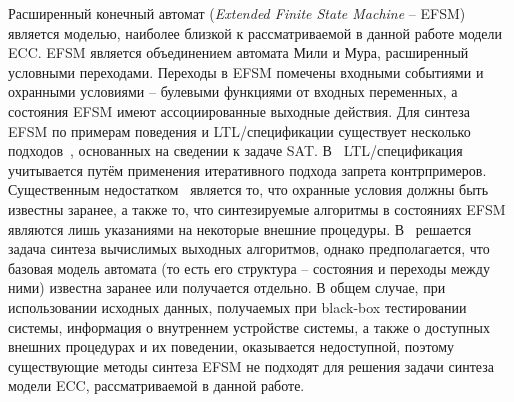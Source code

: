 Расширенный конечный автомат (\emph{Extended Finite State Machine} \--- EFSM) является моделью, наиболее близкой к рассматриваемой в данной работе модели ECC\@. EFSM является объединением автомата Мили и Мура, расширенный условными переходами. Переходы в EFSM помечены входными событиями и охранными условиями \--- булевыми функциями от входных переменных, а состояния EFSM имеют ассоциированные выходные действия.
Для синтеза EFSM по примерам поведения и LTL\-/спецификации существует несколько подходов~\cite{efsm-tools,walkinshaw}, основанных на сведении к задаче SAT. В~\cite{efsm-tools} LTL\-/спецификация учитывается путём применения итеративного подхода запрета контрпримеров.
Существенным недостатком~\cite{efsm-tools} является то, что охранные условия должны быть известны заранее, а также то, что синтезируемые алгоритмы в состояниях EFSM являются лишь указаниями на некоторые внешние процедуры.
В~\cite{walkinshaw} решается задача синтеза вычислимых выходных алгоритмов, однако предполагается, что базовая модель автомата (то есть его структура \--- состояния и переходы между ними) известна заранее или получается отдельно.
В общем случае, при использовании исходных данных, получаемых при black-box тестировании системы, информация о внутреннем устройстве системы, а также о доступных внешних процедурах и их поведении, оказывается недоступной, поэтому существующие методы синтеза EFSM не подходят для решения задачи синтеза модели ECC, рассматриваемой в данной работе.

